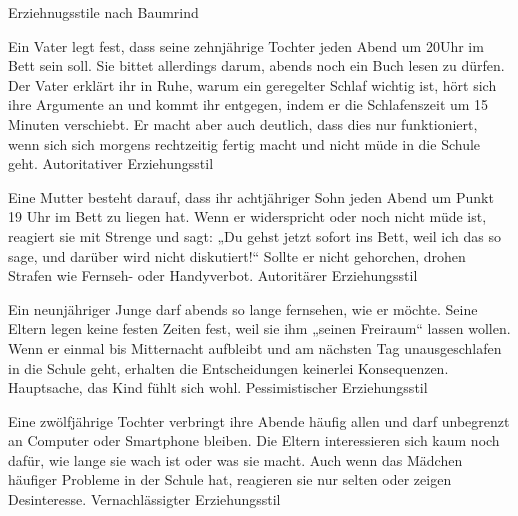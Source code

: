\begin{mapping}{Erziehnugsstile nach Baumrind}
    \begin{answer}
        Ein Vater legt fest, dass seine zehnjährige Tochter jeden Abend um 20Uhr im Bett sein soll. Sie bittet allerdings darum, abends noch ein Buch lesen zu dürfen. Der Vater erklärt ihr in Ruhe, warum ein geregelter Schlaf wichtig ist, hört sich ihre Argumente an und kommt ihr entgegen, indem er die Schlafenszeit um 15 Minuten verschiebt. Er macht aber auch deutlich, dass dies nur funktioniert, wenn sich sich morgens rechtzeitig fertig macht und nicht müde in die Schule geht.
        \ismappedto
        Autoritativer Erziehungsstil
    \end{answer}
    \begin{answer}
        Eine Mutter besteht darauf, dass ihr achtjähriger Sohn jeden Abend um Punkt 19 Uhr im Bett zu liegen hat. Wenn er widerspricht oder noch nicht müde ist, reagiert sie mit Strenge und sagt: „Du gehst jetzt sofort ins Bett, weil ich das so sage, und darüber wird nicht diskutiert!“ Sollte er nicht gehorchen, drohen Strafen wie Fernseh- oder Handyverbot.
        \ismappedto
        Autoritärer Erziehungsstil
    \end{answer}
    \begin{answer}
        Ein neunjähriger Junge darf abends so lange fernsehen, wie er möchte. Seine Eltern legen keine festen Zeiten fest, weil sie ihm „seinen Freiraum“ lassen wollen. Wenn er einmal bis Mitternacht aufbleibt und am nächsten Tag unausgeschlafen in die Schule geht, erhalten die Entscheidungen keinerlei Konsequenzen. Hauptsache, das Kind fühlt sich wohl.
        \ismappedto
        Pessimistischer Erziehungsstil
    \end{answer}
    \begin{answer}
        Eine zwölfjährige Tochter verbringt ihre Abende häufig allen und darf unbegrenzt an Computer oder Smartphone bleiben. Die Eltern interessieren sich kaum noch dafür, wie lange sie wach ist oder was sie macht. Auch wenn das Mädchen häufiger Probleme in der Schule hat, reagieren sie nur selten oder zeigen Desinteresse.
        \ismappedto
        Vernachlässigter Erziehungsstil
    \end{answer}
\end{mapping}

